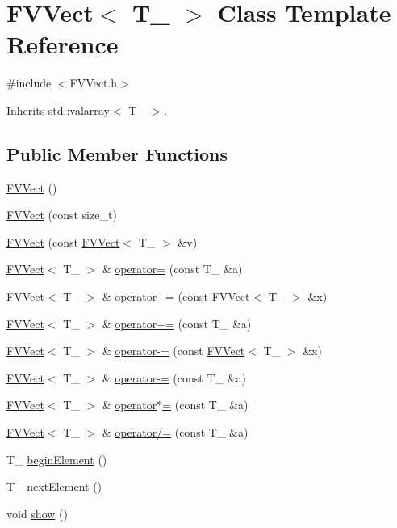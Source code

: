 \hypertarget{classFVVect}{
\section{FVVect$<$ T\_\- $>$ Class Template Reference}
\label{da/d83/classFVVect}
}


{\ttfamily \#include $<$FVVect.h$>$}



Inherits std::valarray$<$ T\_\- $>$.

\subsection*{Public Member Functions}
\begin{DoxyCompactItemize}
\item 
\hyperlink{classFVVect_a0d80f50251de9133bf7d8d2777483267}{FVVect} ()
\item 
\hyperlink{classFVVect_a3fb31edcc8fe2f459bc989b155c69642}{FVVect} (const size\_\-t)
\item 
\hyperlink{classFVVect_a3593eecb9c9e922de3ba16bd625871e4}{FVVect} (const \hyperlink{classFVVect}{FVVect}$<$ T\_\- $>$ \&v)
\item 
\hyperlink{classFVVect}{FVVect}$<$ T\_\- $>$ \& \hyperlink{classFVVect_a42f0279481f20b0770082afa7fe0b1a8}{operator=} (const T\_\- \&a)
\item 
\hyperlink{classFVVect}{FVVect}$<$ T\_\- $>$ \& \hyperlink{classFVVect_a753de7456375015eed8cf1c96e24b331}{operator+=} (const \hyperlink{classFVVect}{FVVect}$<$ T\_\- $>$ \&x)
\item 
\hyperlink{classFVVect}{FVVect}$<$ T\_\- $>$ \& \hyperlink{classFVVect_ab19d5457b29197edc18bcb742321ca34}{operator+=} (const T\_\- \&a)
\item 
\hyperlink{classFVVect}{FVVect}$<$ T\_\- $>$ \& \hyperlink{classFVVect_a6c3a62a3fcc8ead29c7e22694e2bd63a}{operator-\/=} (const \hyperlink{classFVVect}{FVVect}$<$ T\_\- $>$ \&x)
\item 
\hyperlink{classFVVect}{FVVect}$<$ T\_\- $>$ \& \hyperlink{classFVVect_a32ec0b9f4bb1e108764615135131a42e}{operator-\/=} (const T\_\- \&a)
\item 
\hyperlink{classFVVect}{FVVect}$<$ T\_\- $>$ \& \hyperlink{classFVVect_ab1d4c101403d690214f89b8a984fa322}{operator$\ast$=} (const T\_\- \&a)
\item 
\hyperlink{classFVVect}{FVVect}$<$ T\_\- $>$ \& \hyperlink{classFVVect_a5f018a2392b5b74ecff8ae133b461ae2}{operator/=} (const T\_\- \&a)
\item 
T\_\- \hyperlink{classFVVect_a69e15360d6a76b03d874b118c03e47ae}{beginElement} ()
\item 
T\_\- \hyperlink{classFVVect_a9e0d666fe09383e5c4cb6e45516394cf}{nextElement} ()
\item 
void \hyperlink{classFVVect_a4b148f40a95444d5669406b918ad2f52}{show} ()
\end{DoxyCompactItemize}
